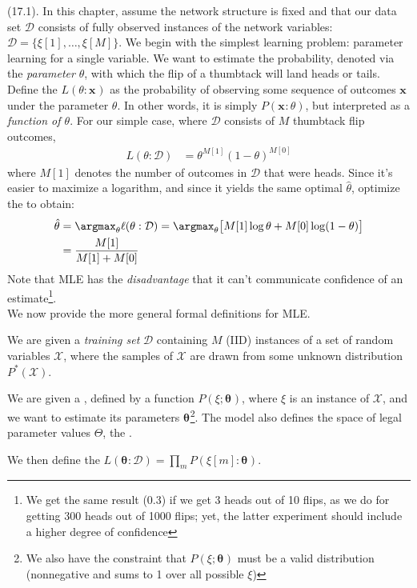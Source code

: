 \documentclass[11pt]{article}
\renewcommand\vec[2][]{\bm{#2}_{#1}}
\newcommand\p{\Needspace{10\baselineskip} \noindent}
\begin{document}
\p {} (17.1). In this chapter, assume the network structure is fixed and that our data set $\mathcal D$ consists of fully observed instances of the network variables: $\mathcal D = \{ \xi[1], \ldots, \xi[M] \}$. We begin with the simplest learning problem: parameter learning for a single variable. We want to estimate the probability, denoted via the \textit{parameter} $\theta$, with which the flip of a thumbtack will land heads or tails. Define the  $L(\theta : \vec{x})$ as the probability of observing some sequence of outcomes $\vec{x}$ under the parameter $\theta$. In other words, it is simply $P(\vec x : \theta)$, but interpreted as a \textit{function of $\theta$}. For our simple case, where $\mathcal D$ consists of $M$ thumbtack flip outcomes,
\begin{align}
	L(\theta : \mathcal D) &= \theta^{M[1]} (1 - \theta)^{M[0]}
\end{align}
where $M[1]$ denotes the number of outcomes in $\mathcal D$ that were heads. Since it's easier to maximize a logarithm, and since it yields the same optimal $\hat \theta$, optimize the  to obtain:
\begin{align}
	\hat \theta &= \argmax_{\theta} \ell (\theta : \mathcal D) = \argmax_{\theta} \big[ M[1] \log\theta + M[0]\log(1 - \theta) \big] \\
	&= \frac{ M[1] }{ M[1] + M[0] }
\end{align}
Note that MLE has the \textit{disadvantage} that it can't communicate confidence of an estimate\footnote{We get the same result (0.3) if we get 3 heads out of 10 flips, as we do for getting 300 heads out of 1000 flips; yet, the latter experiment should include a higher degree of confidence}. \\

We now provide the more general formal definitions for MLE. 
\begin{compactitem}
	\item We are given a \textit{training set} $\mathcal D$ containing $M$ (IID) instances of a set of random variables $\mathcal X$, where the samples of $\mathcal X$ are drawn from some unknown distribution $P^*(\mathcal X)$. 
	
	\item We are given a , defined by a function $P(\xi ; \vec{\theta})$, where $\xi$ is an instance of $\mathcal X$, and we want to estimate its parameters $\vec{\theta}$\footnote{We also have the constraint that $P(\xi ; \vec{\theta})$ must be a valid distribution (nonnegative and sums to 1 over all possible $\xi$)}. The model also defines the space of legal parameter values $\Theta$, the . 
	
	\item We then define the  $L(\vec{\theta} : \mathcal D) = \prod_m P(\xi[m] : \vec{\theta})$. 
\end{compactitem}
\end{document}
